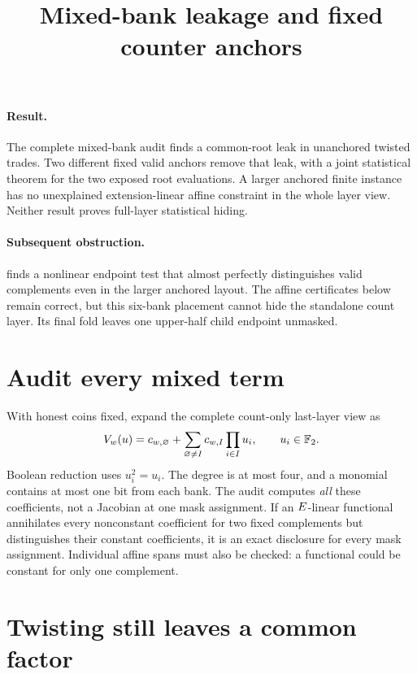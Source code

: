 \documentclass[11pt]{article}
\title{Mixed-bank leakage and fixed counter anchors}
\author{}
\date{}
\begin{document}
\maketitle
\vspace{-2em}

\paragraph{Result.} The complete mixed-bank audit finds a common-root leak in unanchored twisted trades. Two different fixed valid anchors remove that leak, with a joint statistical theorem for the two exposed root evaluations. A larger anchored finite instance has no unexplained extension-linear affine constraint in the whole layer view. Neither result proves full-layer statistical hiding.

\paragraph{Subsequent obstruction.}  finds a nonlinear endpoint test that almost perfectly distinguishes valid complements even in the larger anchored layout. The affine certificates below remain correct, but this six-bank placement cannot hide the standalone count layer. Its final fold leaves one upper-half child endpoint unmasked.

\section{Audit every mixed term}

With honest coins fixed, expand the complete count-only last-layer view as
\[
 V_w(u)=c_{w,\varnothing}+\sum_{\varnothing\ne I}c_{w,I}\prod_{i\in I}u_i,
 \qquad u_i\in\mathbb{F}_2.
\]
Boolean reduction uses $u_i^2=u_i$. The degree is at most four, and a monomial contains at most one bit from each bank. The audit computes \emph{all} these coefficients, not a Jacobian at one mask assignment. If an $E$-linear functional annihilates every nonconstant coefficient for two fixed complements but distinguishes their constant coefficients, it is an exact disclosure for every mask assignment. Individual affine spans must also be checked: a functional could be constant for only one complement.

\section{Twisting still leaves a common factor}
\end{document}
